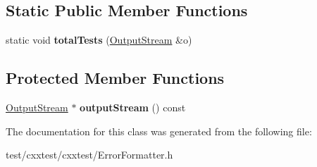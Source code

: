 \subsection*{Static Public Member Functions}
\begin{DoxyCompactItemize}
\item 
\hypertarget{classCxxTest_1_1ErrorFormatter_a9e81e6c50d0abb508eaaa256148fb271}{static void {\bfseries total\-Tests} (\hyperlink{classCxxTest_1_1OutputStream}{Output\-Stream} \&o)}\label{classCxxTest_1_1ErrorFormatter_a9e81e6c50d0abb508eaaa256148fb271}

\end{DoxyCompactItemize}
\subsection*{Protected Member Functions}
\begin{DoxyCompactItemize}
\item 
\hypertarget{classCxxTest_1_1ErrorFormatter_a62580519afc8c1874ef1ad32ec0d57ad}{\hyperlink{classCxxTest_1_1OutputStream}{Output\-Stream} $\ast$ {\bfseries output\-Stream} () const }\label{classCxxTest_1_1ErrorFormatter_a62580519afc8c1874ef1ad32ec0d57ad}

\end{DoxyCompactItemize}


The documentation for this class was generated from the following file\-:\begin{DoxyCompactItemize}
\item 
test/cxxtest/cxxtest/Error\-Formatter.\-h\end{DoxyCompactItemize}
